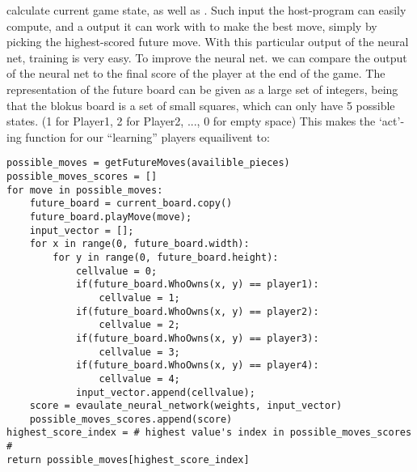\documentclass{report}
\begin{document}
	calculate current game state, as well as . Such input the host-program can easily
	compute, and a output it can work with to make the best move, simply by picking the highest-scored future move. With this particular output of the neural net, training is very easy. To
	improve the neural net. we can compare the output of the neural net to the final score of the player at the end of the game. The representation of the future board can be given as a large set of
	integers, being that the blokus board is a set of small squares, which can only have 5 possible states. (1 for Player1, 2 for Player2, ..., 0 for empty space) This makes the `act'-ing
	function for our ``learning'' players equailivent to:
	\lstset{language=Python}
	\lstset{basicstyle=\footnotesize}
	\begin{lstlisting}
possible_moves = getFutureMoves(availible_pieces)
possible_moves_scores = []
for move in possible_moves:
	future_board = current_board.copy()
	future_board.playMove(move);
	input_vector = [];
	for x in range(0, future_board.width):
		for y in range(0, future_board.height):
			cellvalue = 0;
			if(future_board.WhoOwns(x, y) == player1):
				cellvalue = 1;
			if(future_board.WhoOwns(x, y) == player2):
				cellvalue = 2;
			if(future_board.WhoOwns(x, y) == player3):
				cellvalue = 3;
			if(future_board.WhoOwns(x, y) == player4):
				cellvalue = 4;
			input_vector.append(cellvalue);
	score = evaulate_neural_network(weights, input_vector)
	possible_moves_scores.append(score)
highest_score_index = # highest value's index in possible_moves_scores #
return possible_moves[highest_score_index]
	\end{lstlisting}
	
	\\
	
	
\end{document}
